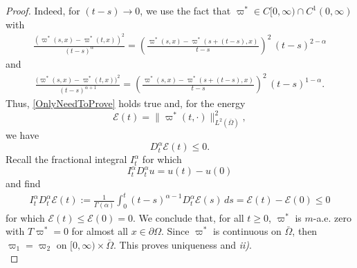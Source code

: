 \documentclass[11pt,a4paper]{article}
\newcommand{\magenta}{black}
\begin{document}
\begin{proof}
Indeed, for $(t-s) \to 0$, we use the fact that $\varpi^* \in C[0, \infty) \cap C^1(0, \infty)$ with
\begin{align*}
\frac{(\varpi^*(s,x) - \varpi^*(t,x))^2}{(t-s)^\alpha} = \left(\frac{\varpi^*(s,x) - \varpi^*(s + (t-s),x)}{t-s} \right)^2 \, (t-s)^{2-\alpha} 
\end{align*} 
and  
\begin{align*}
\frac{\big(\varpi^*(s,x) - \varpi^*(t,x)\big)^2}{(t-s)^{\alpha+1}} = \left( \frac{\varpi^*(s,x) - \varpi^*(s + (t-s),x)}{t-s} \right)^2 \, (t-s)^{1-\alpha}.
\end{align*}
Thus, {\color{\magenta} \eqref{OnlyNeedToProve} holds true and,} for the energy 
$$\mathcal{E}(t) = \| \varpi^*(t, \cdot) \|^2_{L^2(\bar{\Omega})},$$ 
we have 
$$D^\alpha_t \mathcal{E}(t) \leq 0.$$ 
Recall the fractional integral $I^\alpha_t$ for which 
$$I^\alpha_t D^\alpha_t u = u(t)- u(0)$$ 
and find
\begin{align*}
I^\alpha_t D^\alpha_t \mathcal{E}(t):= \frac{1}{\Gamma(\alpha)} \int_0^t (t-s)^{\alpha-1} D^\alpha_t \mathcal{E}(s)\, ds = \mathcal{E}(t) - \mathcal{E}(0) \leq 0
\end{align*}
for which $\mathcal{E}(t) \leq \mathcal{E}(0)=0$. We conclude that, for all $t\geq 0$, $\varpi^*$ is $m$-a.e. zero with $T\varpi^*=0$ for almost all $x \in \partial \Omega$. Since $\varpi^*$ is continuous on $\bar{\Omega}$, then $\varpi_1 = \varpi_2$ on $[0, \infty) \times \bar{\Omega}$. This proves uniqueness and \textit{ii)}.\\



\end{proof}
\end{document}
